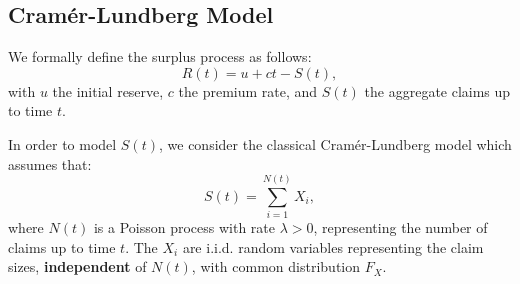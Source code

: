 \documentclass[a4paper, 12pt]{article}
\begin{document}
\subsection{Cramér-Lundberg Model}

We formally define the surplus process as follows:
\begin{equation}
R(t) = u + ct - S(t),
\end{equation}
with $u$ the initial reserve, $c$ the premium rate, and $S(t)$ the aggregate claims up to time $t$. \medskip

In order to model $S(t)$, we consider the classical Cramér-Lundberg model which assumes that:
\begin{equation}
S(t) = \sum_{i=1}^{N(t)} X_i,
\end{equation}
where $N(t)$ is a Poisson process with rate $\lambda > 0$, representing the number of claims up to time $t$. The $X_i$ are i.i.d. random variables representing the claim sizes, \textbf{independent} of $N(t)$, with common distribution $F_X$. \medskip




\end{document}
